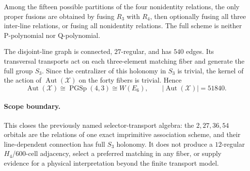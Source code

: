 \begin{corollary}
Among the fifteen possible partitions of the four nonidentity
relations, the only proper fusions are obtained by fusing $R_3$ with
$R_4$, then optionally fusing all three inter-line relations, or fusing
all nonidentity relations.  The full scheme is neither P-polynomial nor
Q-polynomial.

The disjoint-line graph is connected, $27$-regular, and has $540$
edges.  Its transversal transports act on each three-element matching
fiber and generate the full group $S_3$.  Since the centralizer of this
holonomy in $S_3$ is trivial, the kernel of the action of
$\operatorname{Aut}(\mathcal X)$ on the forty fibers is trivial.  Hence
\[
 \operatorname{Aut}(\mathcal X)\cong\operatorname{PGSp}(4,3)
 \cong W(E_6),
 \qquad |\operatorname{Aut}(\mathcal X)|=51840.
\]
\end{corollary}

\paragraph{Scope boundary.}
This closes the previously named selector-transport algebra: the
$2,27,36,54$ orbitals are the relations of one exact imprimitive
association scheme, and their line-dependent connection has full
$S_3$ holonomy.  It does not produce a $12$-regular $H_4$/600-cell
adjacency, select a preferred matching in any fiber, or supply evidence
for a physical interpretation beyond the finite transport model.
